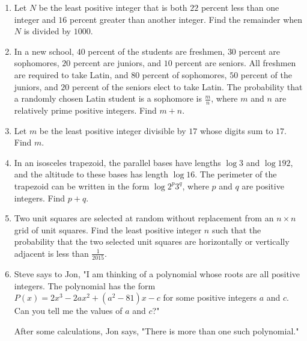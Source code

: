 \documentclass{article}
\begin{document}
\begin{enumerate}[label=\arabic*., itemsep=0.5em]\item Let \(N\) be the least positive integer that is both \(22\) percent less than one integer and \(16\) percent greater than another integer. Find the remainder when \(N\) is divided by \(1000\).\par \vspace{0.5em}\item In a new school, \(40\) percent of the students are freshmen, \(30\) percent are sophomores, \(20\) percent are juniors, and \(10\) percent are seniors. All freshmen are required to take Latin, and \(80\) percent of sophomores, \(50\) percent of the juniors, and \(20\) percent of the seniors elect to take Latin. The probability that a randomly chosen Latin student is a sophomore is \(\frac{m}{n}\), where \(m\) and \(n\) are relatively prime positive integers. Find \(m+n\).\par \vspace{0.5em}\item Let \(m\) be the least positive integer divisible by \(17\) whose digits sum to \(17\). Find \(m\).\par \vspace{0.5em}\item In an isosceles trapezoid, the parallel bases have lengths \(\log 3\) and \(\log 192\), and the altitude to these bases has length \(\log 16\). The perimeter of the trapezoid can be written in the form \(\log 2^p 3^q\), where \(p\) and \(q\) are positive integers. Find \(p + q\).\par \vspace{0.5em}\item Two unit squares are selected at random without replacement from an \(n \times n\) grid of unit squares. Find the least positive integer \(n\) such that the probability that the two selected unit squares are horizontally or vertically adjacent is less than \(\frac{1}{2015}\).\par \vspace{0.5em}\item Steve says to Jon, "I am thinking of a polynomial whose roots are all positive integers. The polynomial has the form \(P(x) = 2x^3-2ax^2+(a^2-81)x-c\) for some positive integers \(a\) and \(c\). Can you tell me the values of \(a\) and \(c\)?"

After some calculations, Jon says, "There is more than one such polynomial."


\end{enumerate}
\end{document}
